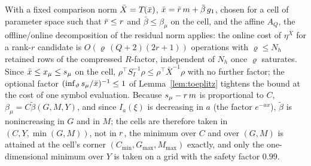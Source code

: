 \begin{remark}\label{rem:reduced-online}
With a fixed comparison norm $\bar X=T_{}(\bar{x})$, $\bar{x}=\bar r\,m+\bar\beta\,g_1$,
chosen for a cell of parameter space such that $\bar r\le r$ and $\bar\beta\le\beta_\mu$ on the cell,
and the affine $A_Q$, the offline/online decomposition of the residual norm applies: the online cost of
$\eta^{\bar X}$ for a rank-$r$ candidate is $O(\varrho\,(Q+2)(2r+1))$ operations with $\varrho\le N_h$ retained rows
of the compressed $R$-factor, independent of $N_h$ once $\varrho$ saturates.  Since
$\bar{x}\le x_\mu\le s_\mu$ on the cell, $\rho^\top S_I^{-1}\rho\le\rho^\top\bar X^{-1}\rho$ with no
further factor; the optional factor $(\inf_\vartheta s_\mu/\bar{x})^{-1}\le1$ of
Lemma~\ref{lem:toeplitz} tightens the bound at the cost of one symbol evaluation.  Because
$s_\mu-r\,m$ is proportional to $C$, $\beta_\mu=C\tilde\beta(G,M,Y)$, and since
$I_a(\xi)$ is decreasing in $a$ (the factor $e^{-ax}$), $\tilde\beta$ is nonincreasing in $G$ and in
$M$; the cells are therefore taken in $(C,Y,\min(G,M))$, not in $r$, the minimum over $C$ and over
$(G,M)$ is attained at the cell's corner $(C_{\min},G_{\max},M_{\max})$ exactly, and only the
one-dimensional minimum over $Y$ is taken on a grid with the safety factor $0.99$.
\end{remark}
